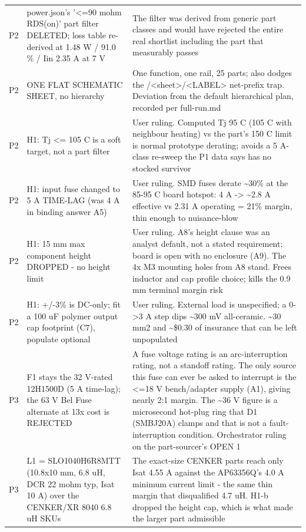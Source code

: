 \documentclass[11pt,a4paper]{article}
\begin{document}
{\begin{longtable}{lp{5.2cm}p{7.2cm}}
P2 & power.json's '\textless{}=90 mohm RDS(on)' part filter DELETED; loss table re-derived at 1.48 W / 91.0 \% / Iin 2.35 A at 7 V & The filter was derived from generic part classes and would have rejected the entire real shortlist including the part that measurably passes \\
P2 & ONE FLAT SCHEMATIC SHEET, no hierarchy & One function, one rail, 25 parts; also dodges the /\textless{}sheet\textgreater{}/\textless{}LABEL\textgreater{} net-prefix trap. Deviation from the default hierarchical plan, recorded per full-run.md \\
P2 & H1: Tj \textless{}= 105 C is a soft target, not a part filter & User ruling. Computed Tj 95 C (105 C with neighbour heating) vs the part's 150 C limit is normal prototype derating; avoids a 5 A-class re-sweep the P1 data says has no stocked survivor \\
P2 & H1: input fuse changed to 5 A TIME-LAG (was 4 A in binding answer A5) & User ruling. SMD fuses derate \textasciitilde{}30\% at the 85-95 C board hotspot: 4 A -\textgreater{} \textasciitilde{}2.8 A effective vs 2.31 A operating = 21\% margin, thin enough to nuisance-blow \\
P2 & H1: 15 mm max component height DROPPED - no height limit & User ruling. A8's height clause was an analyst default, not a stated requirement; board is open with no enclosure (A9). The 4x M3 mounting holes from A8 stand. Frees inductor and cap profile choice; kills the 0.9 mm terminal margin risk \\
P2 & H1: +/-3\% is DC-only; fit a 100 uF polymer output cap footprint (C7), populate optional & User ruling. External load is unspecified; a 0-\textgreater{}3 A step dips \textasciitilde{}300 mV all-ceramic. \textasciitilde{}30 mm2 and \textasciitilde{}\$0.30 of insurance that can be left unpopulated \\
P3 & F1 stays the 32 V-rated 12H1500D (5 A time-lag); the 63 V Bel Fuse alternate at 13x cost is REJECTED & A fuse voltage rating is an arc-interruption rating, not a standoff rating. The only source this fuse can ever be asked to interrupt is the \textless{}=18 V bench/adapter supply (A1), giving nearly 2:1 margin. The \textasciitilde{}36 V figure is a microsecond hot-plug ring that D1 (SMBJ20A) clamps and that is not a fault-interruption condition. Orchestrator ruling on the part-sourcer's OPEN 1 \\
P3 & L1 = SLO1040H6R8MTT (10.8x10 mm, 6.8 uH, DCR 22 mohm typ, Isat 10 A) over the CENKER/XR 8040 6.8 uH SKUs & The exact-size CENKER parts reach only Isat 4.55 A against the AP63356Q's 4.0 A minimum current limit - the same thin margin that disqualified 4.7 uH. H1-b dropped the height cap, which is what made the larger part admissible \\

\end{longtable}}
\end{document}
